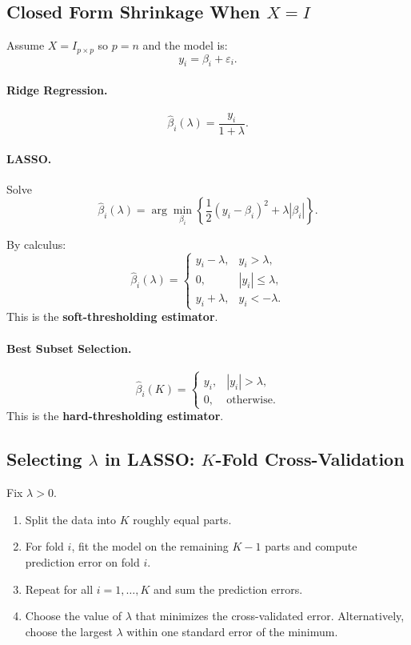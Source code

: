 \subsection{Closed Form Shrinkage When $X = I$}

Assume $X = I_{p \times p}$ so $p=n$ and the model is:
\[
    y_i = \beta_i + \varepsilon_i.
\]

\paragraph{Ridge Regression.}
\[
    \hat{\beta}_i(\lambda)
    = \frac{y_i}{1 + \lambda}.
\]

\paragraph{LASSO.}
Solve
\[
    \hat{\beta}_i(\lambda)
    = \arg\min_{\beta_i}
        \left\{
            \frac{1}{2} (y_i - \beta_i)^2
            + \lambda |\beta_i|
        \right\}.
\]

By calculus:
\[
    \hat{\beta}_i(\lambda)
    =
    \begin{cases}
        y_i - \lambda, & y_i > \lambda, \\
        0, & |y_i| \le \lambda, \\
        y_i + \lambda, & y_i < -\lambda.
    \end{cases}
\]
This is the \textbf{soft-thresholding estimator}.

\paragraph{Best Subset Selection.}
\[
    \hat{\beta}_i(K)
    =
    \begin{cases}
        y_i, & |y_i| > \lambda, \\
        0, & \text{otherwise}.
    \end{cases}
\]
This is the \textbf{hard-thresholding estimator}.

\subsection{Selecting $\lambda$ in LASSO: $K$-Fold Cross-Validation}

Fix $\lambda > 0$.

\begin{enumerate}
    \item Split the data into $K$ roughly equal parts.
    \item For fold $i$, fit the model on the remaining $K-1$ parts and compute prediction error on fold $i$.
    \item Repeat for all $i = 1,\dots,K$ and sum the prediction errors.
    \item Choose the value of $\lambda$ that minimizes the cross-validated error.  
          Alternatively, choose the largest $\lambda$ within one standard error of the minimum.
\end{enumerate}

